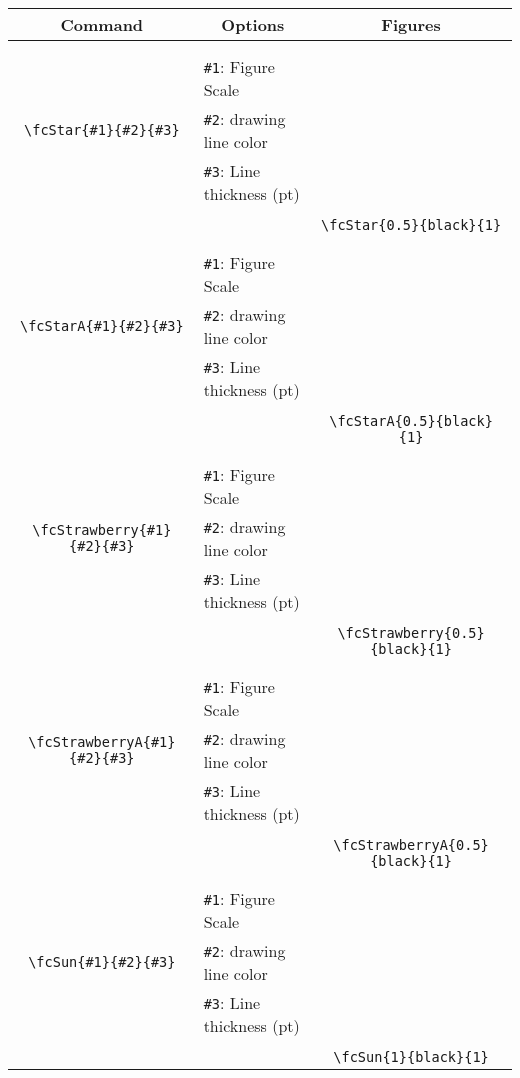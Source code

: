 \documentclass[x11names]{article}
\begin{document}
\begin{table}[H]\centering\begin{tabular}{|c|l|c|}\hline {\bf Command}& \multicolumn{1}{c|}{{\bf Options}} & {\bf Figures}\\  \hline	&&\multirow{5}{*}{\fcStar{0.5}{black}{1}}\\	&&\\	&\verb|#1|: Figure Scale &\\	\verb|\fcStar{#1}{#2}{#3}|&	\verb|#2|: drawing line color &\\	&\verb|#3|: Line thickness (pt) &\\ &&\\&&	\verb|\fcStar{0.5}{black}{1}|\\\hline 	
	&&\multirow{5}{*}{\fcStarA{0.5}{black}{1}}\\	&&\\	&\verb|#1|: Figure Scale &\\	\verb|\fcStarA{#1}{#2}{#3}|&	\verb|#2|: drawing line color &\\	&\verb|#3|: Line thickness (pt) &\\ &&\\&&	\verb|\fcStarA{0.5}{black}{1}|\\\hline 	
	&&\multirow{5}{*}{\fcStrawberry{0.5}{black}{1}}\\	&&\\	&\verb|#1|: Figure Scale &\\	\verb|\fcStrawberry{#1}{#2}{#3}|&	\verb|#2|: drawing line color &\\	&\verb|#3|: Line thickness (pt) &\\ &&\\&&	\verb|\fcStrawberry{0.5}{black}{1}|\\\hline 	
	&&\multirow{5}{*}{\fcStrawberryA{0.5}{black}{1}}\\	&&\\	&\verb|#1|: Figure Scale &\\	\verb|\fcStrawberryA{#1}{#2}{#3}|&	\verb|#2|: drawing line color &\\	&\verb|#3|: Line thickness (pt) &\\ &&\\&&	\verb|\fcStrawberryA{0.5}{black}{1}|\\\hline 	
	&&\multirow{5}{*}{\fcSun{1}{black}{1}}\\	&&\\	&\verb|#1|: Figure Scale &\\	\verb|\fcSun{#1}{#2}{#3}|&	\verb|#2|: drawing line color &\\	&\verb|#3|: Line thickness (pt) &\\ &&\\&&	\verb|\fcSun{1}{black}{1}|\\\hline 	

\end{tabular}
\end{table}
\end{document}
